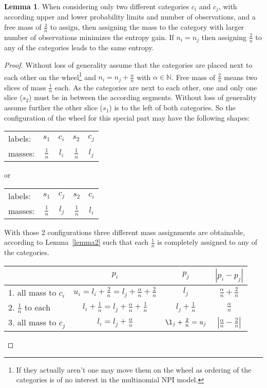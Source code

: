 \documentclass[a4paper]{article}
\theoremstyle{definition} \newtheorem{lemma}{Lemma}
\theoremstyle{remark} \newtheorem{remark}{Remark}
\begin{document}
\begin{lemma}
\label{lemma4}
When considering only two different categories $c_i$ and $c_j$, with according upper and lower probability limits and  number of observations, and a free mass of $\frac{2}{n}$ to assign, then assigning the mass to the category with larger number of observations minimizes the entropy gain. If $n_i = n_j$ then assigning $\frac{2}{n}$ to any of the categories leads to the same entropy.
\end{lemma}
\begin{proof}
Without loss of generality assume that the categories are placed next to each other on the wheel\footnote{If they actually aren't one may move them on the wheel as ordering of the categories is of no interest in the multinomial NPI model.} and $n_i = n_j + \frac{\alpha}{n}$ with $\alpha \in \mathbb{N}$. Free mass of $\frac{2}{n}$ means two slices of mass $\frac{1}{n}$ each. As the categories are next to each other, one and only one slice ($s_2$) must be in between the according segments. Without loss of generality assume further the other slice ($s_1$) is to the left of both categories. So the configuration of the wheel for this special part may have the following shapes:\\
\begin{center}
\begin{tabular}{lcccc}
labels: & $s_1$ & $c_i$ & $s_2$ & $c_j$\\
masses: & \multicolumn{1}{|c|}{$\frac{1}{n}$} & \multicolumn{1}{|c|}{$l_i$} & \multicolumn{1}{|c|}{$\frac{1}{n}$} & \multicolumn{1}{|c|}{$l_j$}
\end{tabular}
\end{center}
or\\
\begin{center}
\begin{tabular}{lcccc}
labels: & $s_1$ & $c_j$ & $s_2$ & $c_i$\\
masses: & \multicolumn{1}{|c|}{$\frac{1}{n}$} & \multicolumn{1}{|c|}{$l_j$} & \multicolumn{1}{|c|}{$\frac{1}{n}$} & \multicolumn{1}{|c|}{$l_i$}
\end{tabular}
\end{center}
With those 2 configurations three different mass assignments are obtainable, according to Lemma~\ref{lemma2} such that each $\frac{1}{n}$ is completely assigned to any of the categories. 

\begin{center}
{\renewcommand{\arraystretch}{1.5}
\begin{tabular}{l|c|c|c}
& $p_i$ & $p_j$ & $|p_i-p_j|$\\
\hline
1. all mass to $c_i$ & $u_i = l_i + \frac{2}{n} = l_j + \frac{\alpha}{n} + \frac{2}{n}$  & $l_j$ & $\frac{\alpha}{n} + \frac{2}{n}$\\
2. $\frac{1}{n}$ to each & $l_i + \frac{1}{n} = l_j + \frac{\alpha}{n} + \frac{1}{n}$  & $l_j + \frac{1}{n}$ & $\frac{\alpha}{n}$\\
3. all mass to $c_j$ & $l_i = l_j + \frac{\alpha}{n}$ & $\l_j + \frac{2}{n} = u_j$ & $|\frac{\alpha}{n} - \frac{2}{n}|$\\
\end{tabular}}
\end{center}


\end{proof}
\end{document}
